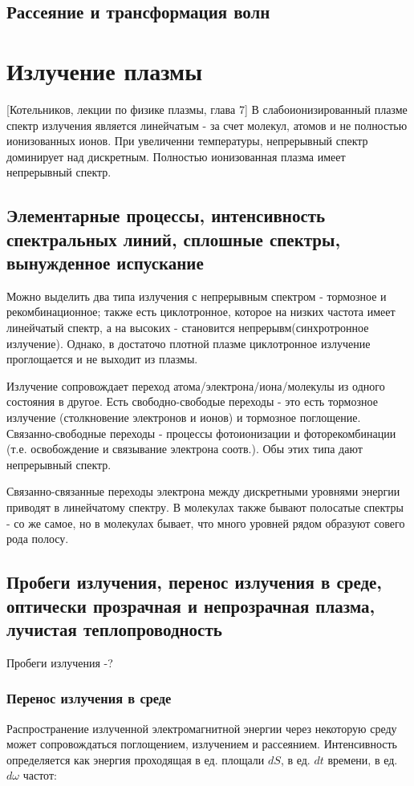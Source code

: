 \documentclass[10pt, a4paper]{article}
\let\stdsection\section
\renewcommand\section{\newpage\stdsection}
\begin{document}
\subsection{Рассеяние и трансформация волн}

\section{Излучение плазмы}
[Котельников, лекции по физике плазмы, глава 7]
В слабоионизированный плазме спектр излучения является линейчатым - за счет молекул, атомов и не полностью ионизованных
ионов. При увеличенни температуры, непрерывный спектр доминирует над дискретным. Полностью ионизованная плазма имеет
непрерывный спектр.
\subsection{Элементарные процессы, интенсивность спектральных линий, сплошные спектры, вынужденное испускание}
Можно выделить два типа излучения с непрерывным спектром - тормозное и рекомбинационное; также есть циклотронное,
которое на низких частота имеет линейчатый спектр, а на высоких - становится непрерывм(синхротронное излучение). Однако,
в достаточо плотной плазме циклотронное излучение проглощается и не выходит из плазмы.

Излучение сопровождает переход атома/электрона/иона/молекулы из одного состояния в другое. Есть свободно-свободые переходы
- это есть тормозное излучение (столкновение электронов и ионов) и тормозное поглощение. Связанно-свободные переходы - 
процессы фотоионизации и фоторекомбинации (т.е. освобождение и связывание электрона соотв.). Обы этих типа дают 
непрерывный спектр.

Связанно-связанные переходы электрона между дискретными уровнями энергии приводят в линейчатому спектру. В молекулах также
бывают полосатые спектры - со же самое, но в молекулах бывает, что много уровней рядом образуют совего рода полосу.

\subsection{Пробеги излучения, перенос излучения в среде, оптически прозрачная и непрозрачная плазма, лучистая теплопроводность}
Пробеги излучения -?

\subsubsection{Перенос излучения в среде}
Распространение излученной электромагнитной энергии через некоторую среду может сопровождаться поглощением, излучением и рассеянием. Интенсивность определяется как энергия проходящая в ед. площали $dS$, в ед. $dt$ времени, в ед. $d\omega$ частот:
\end{document}
